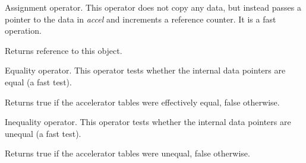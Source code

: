 
Assignment operator. This operator does not copy any data, but instead
passes a pointer to the data in {\it accel} and increments a reference
counter. It is a fast operation.




Returns reference to this object.

\label{wxacceleratortableequal}


Equality operator. This operator tests whether the internal data pointers are
equal (a fast test).




Returns true if the accelerator tables were effectively equal, false otherwise.

\label{wxacceleratortablenotequal}


Inequality operator. This operator tests whether the internal data pointers are
unequal (a fast test).




Returns true if the accelerator tables were unequal, false otherwise.



